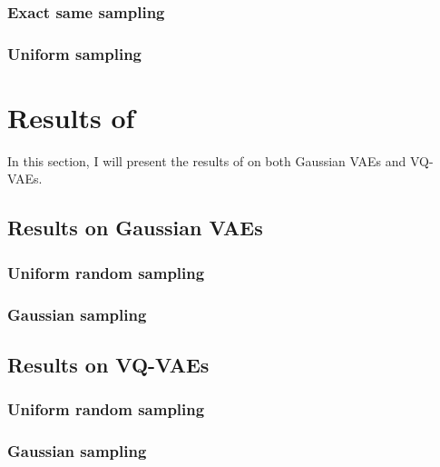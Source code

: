 \subsubsection{Exact same sampling}

\subsubsection{Uniform sampling}


\section{Results of }

In this section, I will present the results of  on both Gaussian VAEs and VQ-VAEs.

\subsection{Results on Gaussian VAEs}

\subsubsection{Uniform random sampling}


\subsubsection{Gaussian sampling}

\subsection{Results on VQ-VAEs}

\subsubsection{Uniform random sampling}

\subsubsection{Gaussian sampling}


